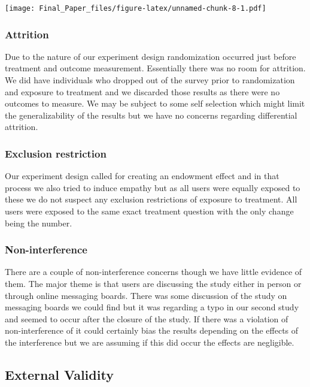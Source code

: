 \documentclass[]{article}
\begin{document}
\texttt{[image: Final\_Paper\_files/figure-latex/unnamed-chunk-8-1.pdf]}

\subsubsection{Attrition}\label{attrition}

Due to the nature of our experiment design randomization occurred just
before treatment and outcome measurement. Essentially there was no room
for attrition. We did have individuals who dropped out of the survey
prior to randomization and exposure to treatment and we discarded those
results as there were no outcomes to measure. We may be subject to some
self selection which might limit the generalizability of the results but
we have no concerns regarding differential attrition.

\subsubsection{Exclusion restriction}\label{exclusion-restriction}

Our experiment design called for creating an endowment effect and in
that process we also tried to induce empathy but as all users were
equally exposed to these we do not suspect any exclusion restrictions of
exposure to treatment. All users were exposed to the same exact
treatment question with the only change being the number.

\subsubsection{Non-interference}\label{non-interference}

There are a couple of non-interference concerns though we have little
evidence of them. The major theme is that users are discussing the study
either in person or through online messaging boards. There was some
discussion of the study on messaging boards we could find but it was
regarding a typo in our second study and seemed to occur after the
closure of the study. If there was a violation of non-interference of it
could certainly bias the results depending on the effects of the
interference but we are assuming if this did occur the effects are
negligible.

\subsection{External Validity}\label{external-validity}
\end{document}

